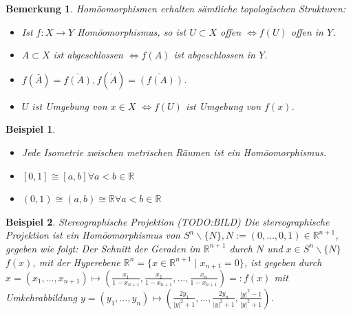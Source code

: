 \documentclass[a4paper,11pt,notitlepage]{report}
\newtheorem{remark}{Bemerkung}[chapter]
\newtheorem{example}{Beispiel}[chapter]
\newcommand{\R}{{\ensuremath{\mathbb{R}}}}
\begin{document}
\begin{remark}
	Homöomorphismen erhalten sämtliche topologischen Strukturen:
	\begin{itemize}
		\item Ist $f \colon X \rightarrow Y$ Homöomorphismus, so ist $U \subset X$ offen $\Leftrightarrow f(U)$ offen in $Y$.
		\item $A \subset X$ ist abgeschlossen $\Leftrightarrow f(A)$ ist abgeschlossen in $Y$.
		\item $f(\bar{A}) = \bar{f(A)}, f(\mathring A) = \mathring{\left(f(A)\right)}$.
		\item $U$ ist Umgebung von $x \in X$ $\Leftrightarrow f(U)$ ist Umgebung von $f(x)$.
	\end{itemize}
\end{remark}

\begin{example}
	\begin{itemize}
		\item Jede Isometrie zwischen metrischen Räumen ist ein Homöomorphismus.
		\item $[0,1] \cong [a,b] \forall a < b \in \R$
		\item $(0,1) \cong (a,b) \cong \R \forall a < b \in \R$
	\end{itemize}
\end{example}

\begin{example}{Stereographische Projektion}
	(TODO:BILD)
	\newline
	Die stereographische Projektion ist ein Homöomorphismus von $S^n \backslash \{N\}, N := (0, \ldots, 0, 1) \in \R^{n+1}$, gegeben wie folgt:
	\newline
	Der Schnitt der Geraden im $\R^{n+1}$ durch $N$ und $x \in S^n \backslash \{N\}$ $f(x)$, mit der Hyperebene $\R^n=\{x \in \R^{n+1} \mid x_{n+1} = 0 \}$, ist gegeben durch $x = (x_1, \ldots, x_{n+1}) \mapsto (\frac{x_1}{1-x_{n+1}}, \frac{x_2}{1-x_{n+1}}, \ldots, \frac{x_n}{1-x_{n+1}}) =: f(x)$ mit Umkehrabbildung $y = (y_1, \ldots, y_n) \mapsto (\frac{2 y_1}{|y|^2+1}, \ldots, \frac{2 y_n}{|y|^2+1},\frac{|y|^2-1}{|y|^2+1})$.
\end{example}
\end{document}
